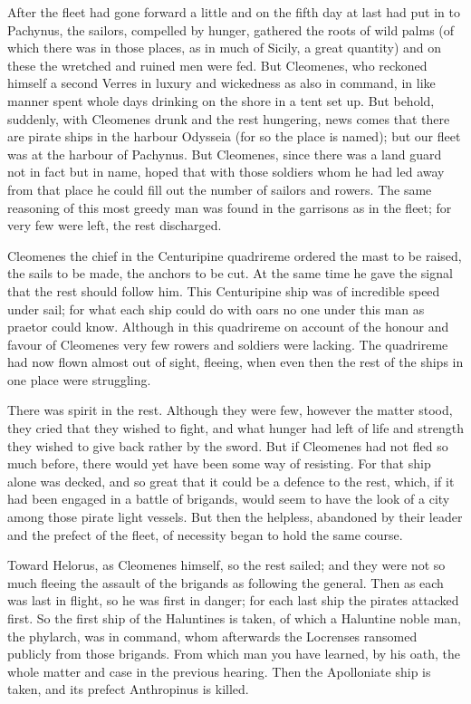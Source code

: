  After the fleet had gone forward a little and on the fifth day at last had put in to Pachynus, the sailors, compelled by hunger, gathered the roots of wild palms (of which there was in those places, as in much of Sicily, a great quantity) and on these the wretched and ruined men were fed. But Cleomenes, who reckoned himself a second Verres in luxury and wickedness as also in command, in like manner spent whole days drinking on the shore in a tent set up. But behold, suddenly, with Cleomenes drunk and the rest hungering, news comes that there are pirate ships in the harbour Odysseia (for so the place is named); but our fleet was at the harbour of Pachynus. But Cleomenes, since there was a land guard not in fact but in name, hoped that with those soldiers whom he had led away from that place he could fill out the number of sailors and rowers. The same reasoning of this most greedy man was found in the garrisons as in the fleet; for very few were left, the rest discharged.

 Cleomenes the chief in the Centuripine quadrireme ordered the mast to be raised, the sails to be made, the anchors to be cut. At the same time he gave the signal that the rest should follow him. This Centuripine ship was of incredible speed under sail; for what each ship could do with oars no one under this man as praetor could know. Although in this quadrireme on account of the honour and favour of Cleomenes very few rowers and soldiers were lacking. The quadrireme had now flown almost out of sight, fleeing, when even then the rest of the ships in one place were struggling.

 There was spirit in the rest. Although they were few, however the matter stood, they cried that they wished to fight, and what hunger had left of life and strength they wished to give back rather by the sword. But if Cleomenes had not fled so much before, there would yet have been some way of resisting. For that ship alone was decked, and so great that it could be a defence to the rest, which, if it had been engaged in a battle of brigands, would seem to have the look of a city among those pirate light vessels. But then the helpless, abandoned by their leader and the prefect of the fleet, of necessity began to hold the same course.

 Toward Helorus, as Cleomenes himself, so the rest sailed; and they were not so much fleeing the assault of the brigands as following the general. Then as each was last in flight, so he was first in danger; for each last ship the pirates attacked first. So the first ship of the Haluntines is taken, of which a Haluntine noble man, the phylarch, was in command, whom afterwards the Locrenses ransomed publicly from those brigands. From which man you have learned, by his oath, the whole matter and case in the previous hearing. Then the Apolloniate ship is taken, and its prefect Anthropinus is killed.

